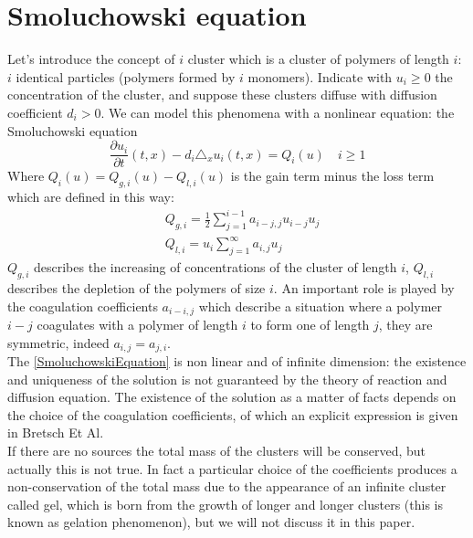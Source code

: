 \section{Smoluchowski equation}
Let's introduce the concept of $i$ cluster which is a cluster of polymers of length $i$: $i $ identical particles (polymers formed by $i$ monomers). Indicate with $u_{i}\geq0$ the concentration of the cluster, and suppose these clusters diffuse with diffusion coefficient $d_{i}>0$.
We can model this phenomena with a nonlinear equation: the Smoluchowski equation
\begin{equation}
\frac{\partial u_{i}}{\partial t}(t, x)-d_{i} \triangle_{x} u_{i}(t, x)=Q_{i}(u) \quad i \geq 1
\label{SmoluchowskiEquation}\end{equation} 
Where $Q_{i}(u)=Q_{g,i}(u)-Q_{l,i}(u)$ is the gain term minus the loss term which  are defined in this way:\\

$$
\begin{aligned}
&Q_{g, i}=\frac{1}{2} \sum_{j=1}^{i-1} a_{i-j, j} u_{i-j} u_{j} \\
&Q_{l, i}=u_{i} \sum_{j=1}^{\infty} a_{i, j} u_{j}
\end{aligned}
$$
$Q_{g,i}$ describes the increasing of concentrations of the cluster of length $i$,
$Q_{l,i}$ describes the depletion of the polymers of size $i$.
An important role is played by the coagulation coefficients $a_{i-i,j}$ which describe a situation where a polymer $i-j$ coagulates with a polymer of length $i$ to form one of length $j$, they are symmetric, indeed $a_{i,j}=a_{j,i}$.\\
The \eqref{SmoluchowskiEquation} is non linear and of infinite dimension: the existence and uniqueness of the solution is not guaranteed by the theory of reaction and diffusion equation. The existence of the solution as a matter of facts depends on the choice of the coagulation coefficients, of which an explicit expression is given in Bretsch Et Al. \\
If there are no sources the total mass of the clusters will be conserved, but actually this is not true. In fact a particular choice of the coefficients produces a non-conservation of the total mass due to the appearance of an infinite cluster called gel, which is born from the growth of longer and longer clusters (this is known as gelation phenomenon), but we will not discuss it in this paper.
